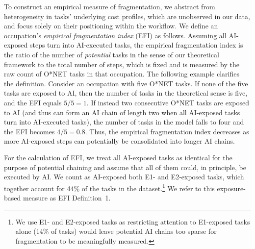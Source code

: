 To construct an empirical measure of fragmentation, we abstract from heterogeneity in tasks' underlying cost profiles, which are unobserved in our data, and focus solely on their positioning within the workflow.
We define an occupation's \emph{empirical fragmentation index} (EFI) as follows.
Assuming all AI-exposed steps turn into AI-executed tasks, the empirical fragmentation index is the ratio of the number of \emph{potential} tasks in the sense of our theoretical framework to the total number of steps, which is fixed and is measured by the raw count of O*NET tasks in that occupation.
The following example clarifies the definition.
Consider an occupation with five O*NET tasks.
If none of the five tasks are exposed to AI, then the number of tasks in the theoretical sense is five, and the EFI equals $5/5 = 1$.
If instead two consecutive O*NET tasks are exposed to AI (and thus can form an AI chain of length two when all AI-exposed tasks turn into AI-executed tasks), the number of tasks in the model falls to four and the EFI becomes $4/5 = 0.8$.
Thus, the empirical fragmentation index decreases as more AI-exposed steps can potentially be consolidated into longer AI chains.

For the calculation of EFI, we treat all AI-exposed tasks as identical for the purpose of potential chaining and assume that all of them could, in principle, be executed by AI.
We count as AI-exposed both E1- and E2-exposed tasks, which together account for 44\% of the tasks in the dataset.\footnote{We use E1- and E2-exposed tasks as restricting attention to E1-exposed tasks alone (14\% of tasks) would leave potential AI chains too sparse for fragmentation to be meaningfully measured.}
We refer to this exposure-based measure as EFI Definition~1.

